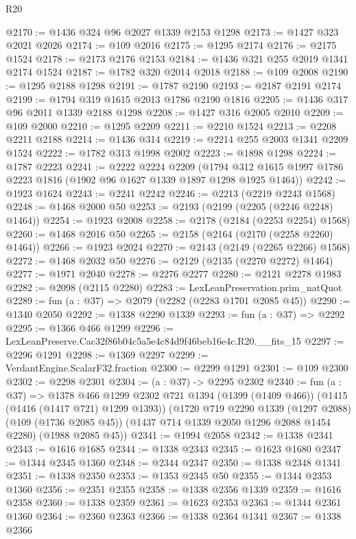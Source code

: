 \begin{lexlean}{R20}
\begin{coremodule}
@2170 := @1436 @324 @96 @2027 @1339 @2153 @1298
@2173 := @1427 @323 @2021 @2026
@2174 := @109 @2016
@2175 := @1295 @2174
@2176 := @2175 @1524
@2178 := @2173 @2176 @2153
@2184 := @1436 @321 @255 @2019 @1341 @2174 @1524
@2187 := @1782 @320 @2014 @2018
@2188 := @109 @2008
@2190 := @1295 @2188 @1298
@2191 := @1787 @2190
@2193 := @2187 @2191 @2174
@2199 := @1794 @319 @1615 @2013 @1786 @2190 @1816
@2205 := @1436 @317 @96 @2011 @1339 @2188 @1298
@2208 := @1427 @316 @2005 @2010
@2209 := @109 @2000
@2210 := @1295 @2209
@2211 := @2210 @1524
@2213 := @2208 @2211 @2188
@2214 := @1436 @314
@2219 := @2214 @255 @2003 @1341 @2209 @1524
@2222 := @1782 @313 @1998 @2002
@2223 := @1898 @1298
@2224 := @1787 @2223
@2241 := @2222
    @2224
    @2209
    (@1794 @312 @1615 @1997 @1786 @2223 @1816 (@1902 @96 @1627 @1339 @1897 @1298 @1925 @1464))
@2242 := @1923 @1624
@2243 := @2241 @2242
@2246 := @2213 (@2219 @2243 @1568)
@2248 := @1468 @2000 @50
@2253 := @2193 (@2199 (@2205 (@2246 @2248) @1464))
@2254 := @1923 @2008
@2258 := @2178 (@2184 (@2253 @2254) @1568)
@2260 := @1468 @2016 @50
@2265 := @2158 (@2164 (@2170 (@2258 @2260) @1464))
@2266 := @1923 @2024
@2270 := @2143 (@2149 (@2265 @2266) @1568)
@2272 := @1468 @2032 @50
@2276 := @2129 (@2135 (@2270 @2272) @1464)
@2277 := @1971 @2040
@2278 := @2276 @2277
@2280 := @2121 @2278 @1983
@2282 := @2098 (@2115 @2280)
@2283 := LexLeanPreservation.prim_natQuot
@2289 := fun (a : @37) => @2079 (@2282 (@2283 @1701 @2085 @45))
@2290 := @1340 @2050
@2292 := @1338 @2290 @1339
@2293 := fun (a : @37) => @2292
@2295 := @1366 @466 @1299
@2296 := LexLeanPreserve.Cac32f86b04c5a5e4c84d9f46beb16e4c.R20.__fits_15
@2297 := @2296 @1291
@2298 := @1369 @2297
@2299 := VerdantEngine.ScalarF32.fraction
@2300 := @2299 @1291
@2301 := @109 @2300
@2302 := @2298 @2301
@2304 := (a : @37) -> @2295 @2302
@2340 := fun (a : @37) =>
  @1378
    @466
    @1299
    @2302
    @721
    @1394
    (@1399 (@1409 @466))
    (@1415 (@1416 (@1417 @721) @1299 @1393))
    (@1720
      @719
      @2290
      @1339
      (@1297 @2088)
      (@109 (@1736 @2085 @45))
      (@1437 @714 @1339 @2050 @1296 @2088 @1454 @2280)
      (@1988 @2085 @45))
@2341 := @1994 @2058
@2342 := @1338 @2341
@2343 := @1616 @1685
@2344 := @1338 @2343
@2345 := @1623 @1680
@2347 := @1344 @2345 @1360
@2348 := @2344 @2347
@2350 := @1338 @2348 @1341
@2351 := @1338 @2350
@2353 := @1353 @2345 @50
@2355 := @1344 @2353 @1360
@2356 := @2351 @2355
@2358 := @1338 @2356 @1339
@2359 := @1616 @2358
@2360 := @1338 @2359
@2361 := @1623 @2353
@2363 := @1344 @2361 @1360
@2364 := @2360 @2363
@2366 := @1338 @2364 @1341
@2367 := @1338 @2366

\end{coremodule}
\end{lexlean}
